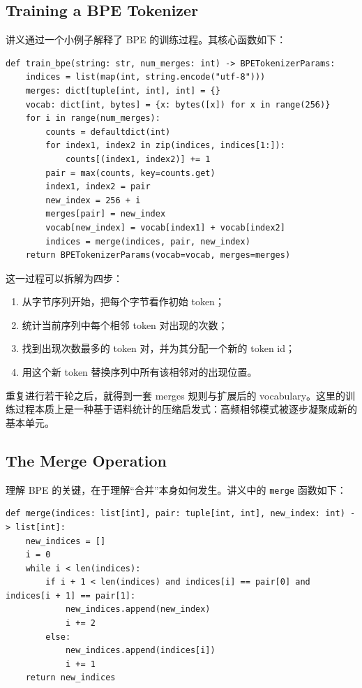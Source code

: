 \documentclass[a4paper,UTF8]{article}
\numberwithin{equation}{section}
\begin{document}
\subsection{Training a BPE Tokenizer}

讲义通过一个小例子解释了 BPE 的训练过程。其核心函数如下：

\begin{verbatim}
def train_bpe(string: str, num_merges: int) -> BPETokenizerParams:
    indices = list(map(int, string.encode("utf-8")))
    merges: dict[tuple[int, int], int] = {}
    vocab: dict[int, bytes] = {x: bytes([x]) for x in range(256)}
    for i in range(num_merges):
        counts = defaultdict(int)
        for index1, index2 in zip(indices, indices[1:]):
            counts[(index1, index2)] += 1
        pair = max(counts, key=counts.get)
        index1, index2 = pair
        new_index = 256 + i
        merges[pair] = new_index
        vocab[new_index] = vocab[index1] + vocab[index2]
        indices = merge(indices, pair, new_index)
    return BPETokenizerParams(vocab=vocab, merges=merges)
\end{verbatim}

这一过程可以拆解为四步：
\begin{enumerate}
    \item 从字节序列开始，把每个字节看作初始 token；
    \item 统计当前序列中每个相邻 token 对出现的次数；
    \item 找到出现次数最多的 token 对，并为其分配一个新的 token id；
    \item 用这个新 token 替换序列中所有该相邻对的出现位置。
\end{enumerate}
重复进行若干轮之后，就得到一套 merges 规则与扩展后的 vocabulary。这里的训练过程本质上是一种基于语料统计的压缩启发式：高频相邻模式被逐步凝聚成新的基本单元。

\subsection{The Merge Operation}

理解 BPE 的关键，在于理解“合并”本身如何发生。讲义中的 \verb|merge| 函数如下：

\begin{verbatim}
def merge(indices: list[int], pair: tuple[int, int], new_index: int) -> list[int]:
    new_indices = []
    i = 0
    while i < len(indices):
        if i + 1 < len(indices) and indices[i] == pair[0] and indices[i + 1] == pair[1]:
            new_indices.append(new_index)
            i += 2
        else:
            new_indices.append(indices[i])
            i += 1
    return new_indices
\end{verbatim}
\end{document}
